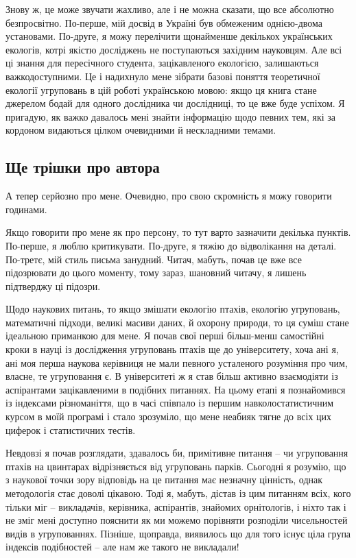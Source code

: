 \documentclass[
  11pt,
]{book}
\begin{document}
Знову ж, це може звучати жахливо, але і не можна сказати, що все абсолютно безпросвітно. По-перше, мій досвід в Україні був обмеженим однією-двома установами. По-друге, я можу перелічити щонайменше декількох українських екологів, котрі якістю досліджень не поступаються західним науковцям. Але всі ці знання для пересічного студента, зацікавленого екологією, залишаються важкодоступними. Це і надихнуло мене зібрати базові поняття теоретичної екології угруповань в цій роботі українською мовою: якщо ця книга стане джерелом бодай для одного дослідника чи дослідниці, то це вже буде успіхом. Я пригадую, як важко давалось мені знайти інформацію щодо певних тем, які за кордоном видаються цілком очевидними й нескладними темами.

\subsection{Ще трішки про автора}\label{more-about-author}

А тепер серйозно про мене. Очевидно, про свою скромність я можу говорити годинами.

Якщо говорити про мене як про персону, то тут варто зазначити декілька пунктів. По-перше, я люблю критикувати. По-друге, я тяжію до відволікання на деталі. По-третє, мій стиль письма занудний. Читач, мабуть, почав це вже все підозрювати до цього моменту, тому зараз, шановний читачу, я лишень підтверджу ці підозри.

Щодо наукових питань, то якщо змішати екологію птахів, екологію угруповань, математичні підходи, великі масиви даних, й охорону природи, то ця суміш стане ідеальною приманкою для мене. Я почав свої перші більш-менш самостійні кроки в науці із дослідження угруповань птахів ще до університету, хоча ані я, ані моя перша наукова керівниця не мали певного усталеного розуміння про чим, власне, те угруповання є. В університеті ж я став більш активно взаємодіяти із аспірантами зацікавленими в подібних питаннях. На цьому етапі я познайомився із індексами різноманіття, що в часі співпало із першим навколостатистичним курсом в моїй програмі і стало зрозуміло, що мене неабияк тягне до всіх цих циферок і статистичних тестів.

Невдовзі я почав розглядати, здавалось би, примітивне питання -- чи угруповання птахів на цвинтарах відрізняється від угруповань парків. Сьогодні я розумію, що з наукової точки зору відповідь на це питання має незначну цінність, однак методологія стає доволі цікавою. Тоді я, мабуть, дістав із цим питанням всіх, кого тільки міг -- викладачів, керівника, аспірантів, знайомих орнітологів, і ніхто так і не зміг мені доступно пояснити як ми можемо порівняти розподіли чисельностей видів в угрупованнях. Пізніше, щоправда, виявилось що для того існує ціла група індексів подібностей -- але нам же такого не викладали!
\end{document}
